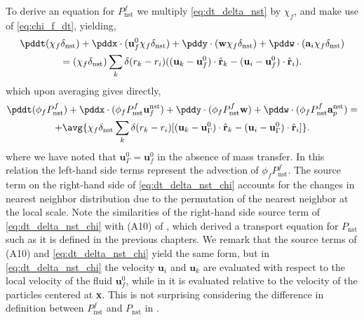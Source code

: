 To derive an equation for $P_\text{nst}^f$ we multiply \ref{eq:dt_delta_nst} by $\chi_f$, and make use of \ref{eq:chi_f_dt}, yielding, 
\begin{multline}
    \pddt (\chi_f\delta_\text{nst})
    +  \pddx \cdot (\textbf{u}_f^0 \chi_f\delta_\text{nst})
    +  \pddy \cdot (\textbf{w}    \chi_f\delta_\text{nst})
    +  \pddw \cdot   (\textbf{a}_i  \chi_f\delta_\text{nst})\\
    = 
    (\chi_f\delta_\text{nst})
    \sum_k 
    \delta(r_k - r_i)
    ((\textbf{u}_k - \textbf{u}_f^0) \cdot \hat{\textbf{r}}_k - (\textbf{u}_i  - \textbf{u}_f^0)\cdot \hat{\textbf{r}}_i). 
    \label{eq:dt_delta_nst_f}
\end{multline}
which upon averaging gives directly,
\begin{multline}
    \pddt (\phi_fP_\text{nst}^f)
    + 
    \pddx \cdot (
        \phi_f 
        P_\text{nst}^f
        \textbf{u}_f^\text{nst}
    )
    + \pddy \cdot (
        \phi_f
        P_\text{nst}^f
        \textbf{w} 
    )
    +
    \pddw \cdot (  
        \phi_f 
        P_\text{nst}^f
        \textbf{a}_p^\text{nst} 
    )
    = \\
    + \avg{
     \chi_f \delta_\text{nst}
    \sum_k 
    \delta(r_k - r_i)
    [(\textbf{u}_k - \textbf{u}_\Gamma^0) \cdot \hat{\textbf{r}}_k - (\textbf{u}_i- \textbf{u}_\Gamma^0)  \cdot \hat{\textbf{r}}_i]}.
    \label{eq:dt_P_nst_chi}
\end{multline}
where we have noted that $\textbf{u}_\Gamma^0 = \textbf{u}_f^0$ in the absence of mass transfer. 
In this relation the left-hand side terms represent the advection of $\phi_f P_\text{nst}^f$.
The source term on the right-hand side of \ref{eq:dt_delta_nst_chi} accounts for the changes in nearest neighbor distribution due to the permutation of the nearest neighbor at the local scale. 
Note the similarities of the right-hand side source term of \ref{eq:dt_delta_nst_chi} with (A10) of \citet{zhang2023evolution}, which derived a transport equation for $P_\text{nst}$ such as it is defined in the previous chapters. 
We remark that the source terms of (A10) and \ref{eq:dt_delta_nst_chi} yield the same form, but in \ref{eq:dt_delta_nst_chi} the velocity $\textbf{u}_i$ and $\textbf{u}_k$ are evaluated with respect to the local velocity of the fluid $\textbf{u}_f^0$, while in \citet{zhang2023evolution} it is evaluated relative to the velocity of the particles centered at \textbf{x}. 
This is not surprising considering the difference in definition between $P_\text{nst}^f$ and $P_\text{nst}$ in \citet{zhang2023evolution}. 


